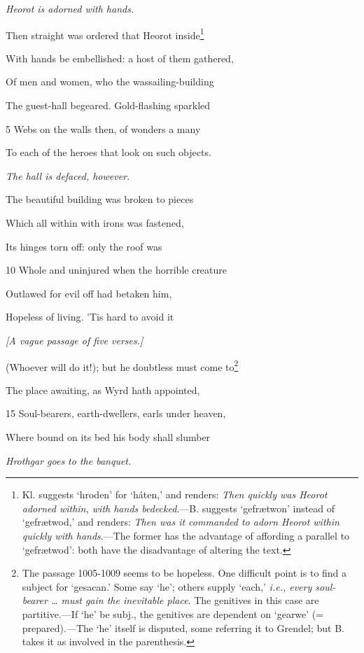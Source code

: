 

\emph{Heorot is adorned
with hands.}

Then straight was ordered that Heorot inside\footnote{Kl. suggests ‘hroden’ for ‘háten,’ and renders: \emph{Then quickly was
Heorot adorned within, with hands bedecked}.—B. suggests ‘gefrætwon’ instead
of ‘gefrætwod,’ and renders: \emph{Then was it commanded to adorn Heorot
within quickly with hands}.—The former has the advantage of affording a
parallel to ‘gefrætwod’: both have the disadvantage of altering the text.}

With hands be embellished: a host of them gathered,

Of men and women, who the wassailing-building

The guest-hall begeared. Gold-flashing sparkled

5
Webs on the walls then, of wonders a many

To each of the heroes that look on such objects.

\emph{The hall is defaced,
however.}

The beautiful building was broken to pieces

Which all within with irons was fastened,

Its hinges torn off: only the roof was

10
Whole and uninjured when the horrible creature

Outlawed for evil off had betaken him,

Hopeless of living. ’Tis hard to avoid it

\emph{[A vague passage
of five verses.]}

(Whoever will do it!); but he doubtless must come to\footnote{The passage 1005-1009 seems to be hopeless. One difficult point is to
find a subject for ‘gesacan.’ Some say ‘he’; others supply ‘each,’ \emph{i.e., every
soul-bearer … must gain the inevitable place}. The genitives in this case are
partitive.—If ‘he’ be subj., the genitives are dependent on ‘gearwe’ (= prepared).—The
‘he’ itself is disputed, some referring it to Grendel; but B.
takes it as involved in the parenthesis.}

The place awaiting, as Wyrd hath appointed,

15
Soul-bearers, earth-dwellers, earls under heaven,

Where bound on its bed his body shall slumber

\emph{Hrothgar goes to
the banquet.}

